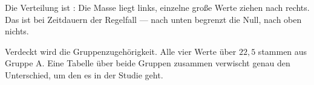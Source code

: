 \begin{aufgabe}
Die Verteilung ist : Die Masse liegt links, einzelne große Werte ziehen nach rechts. Das ist bei Zeitdauern der Regelfall --- nach unten begrenzt die Null, nach oben nichts.

Verdeckt wird die Gruppenzugehörigkeit. Alle vier Werte über $22{,}5$ stammen aus Gruppe A. Eine Tabelle über beide Gruppen zusammen verwischt genau den Unterschied, um den es in der Studie geht.

\begin{center}
\begin{minipage}{0.86\textwidth}
\end{minipage}
\end{center}
\end{aufgabe}

